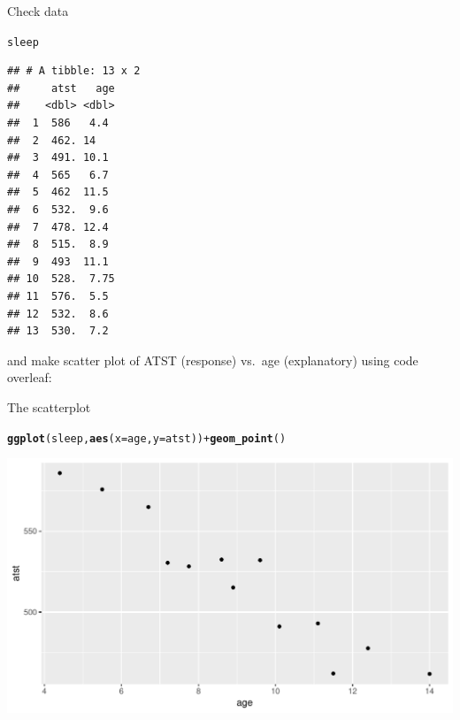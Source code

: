 \documentclass[unknownkeysallowed]{beamer}\usepackage[]{graphicx}\usepackage[]{color}
\makeatletter
\def\maxwidth{ %
  \ifdim\Gin@nat@width>\linewidth
    \linewidth
  \else
    \Gin@nat@width
  \fi
}
\newcommand{\hlopt}[1]{\textcolor[rgb]{0,0,0}{#1}}%
\newcommand{\hlstd}[1]{\textcolor[rgb]{0.345,0.345,0.345}{#1}}%
\newcommand{\hlkwc}[1]{\textcolor[rgb]{0.333,0.667,0.333}{#1}}%
\newcommand{\hlkwd}[1]{\textcolor[rgb]{0.737,0.353,0.396}{\textbf{#1}}}%
\newenvironment{kframe}{%
 \def\at@end@of@kframe{}%
 \ifinner\ifhmode%
  \def\at@end@of@kframe{\end{minipage}}%
  \begin{minipage}{\columnwidth}%
 \fi\fi%
 \def\FrameCommand##1{\hskip\@totalleftmargin \hskip-\fboxsep
 \colorbox{shadecolor}{##1}\hskip-\fboxsep
     \hskip-\linewidth \hskip-\@totalleftmargin \hskip\columnwidth}%
 \MakeFramed {\advance\hsize-\width
   \@totalleftmargin\z@ \linewidth\hsize
   \@setminipage}}%
 {\par\unskip\endMakeFramed%
 \at@end@of@kframe}
\newenvironment{knitrout}{}{} %
\makeatother
\begin{document}
\begin{frame}[fragile]{Check data}
  
\begin{knitrout}\footnotesize
{}\color{fgcolor}\begin{kframe}
\begin{alltt}
\hlstd{sleep}
\end{alltt}
\begin{verbatim}
## # A tibble: 13 x 2
##     atst   age
##    <dbl> <dbl>
##  1  586   4.4 
##  2  462. 14   
##  3  491. 10.1 
##  4  565   6.7 
##  5  462  11.5 
##  6  532.  9.6 
##  7  478. 12.4 
##  8  515.  8.9 
##  9  493  11.1 
## 10  528.  7.75
## 11  576.  5.5 
## 12  532.  8.6 
## 13  530.  7.2
\end{verbatim}
\end{kframe}
\end{knitrout}

and make scatter plot of ATST (response) vs.\ age (explanatory) using
code overleaf:

\end{frame}




\begin{frame}[fragile]{The scatterplot}
   
\begin{knitrout}
\color{fgcolor}\begin{kframe}
\begin{alltt}
\hlkwd{ggplot}\hlstd{(sleep,}\hlkwd{aes}\hlstd{(}\hlkwc{x}\hlstd{=age,}\hlkwc{y}\hlstd{=atst))}\hlopt{+}\hlkwd{geom_point}\hlstd{()}
\end{alltt}
\end{kframe}
\includegraphics[width=\maxwidth]{figure/suggo-1} 

\end{knitrout}
  
  

\end{frame}
\end{document}
